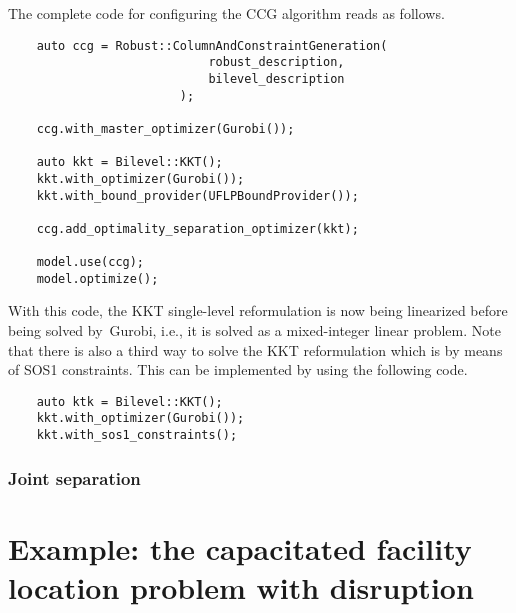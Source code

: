 The complete code for configuring the CCG algorithm reads as follows.
\begin{lstlisting}
    auto ccg = Robust::ColumnAndConstraintGeneration(
                            robust_description,
                            bilevel_description
                        );
    
    ccg.with_master_optimizer(Gurobi());

    auto kkt = Bilevel::KKT();
    kkt.with_optimizer(Gurobi());
    kkt.with_bound_provider(UFLPBoundProvider());

    ccg.add_optimality_separation_optimizer(kkt);

    model.use(ccg);
    model.optimize();
\end{lstlisting}

With this code, the KKT single-level reformulation is now being linearized
before being solved by~\textsf{Gurobi}, i.e., it is solved as a mixed-integer
linear problem. Note that there is also a third way to solve the KKT
reformulation which is by means of SOS1 constraints. This can be implemented
by using the following code.
%
\begin{lstlisting}
    auto ktk = Bilevel::KKT();
    kkt.with_optimizer(Gurobi());
    kkt.with_sos1_constraints();   
\end{lstlisting}





\subsubsection{Joint separation}







\section[Example: the CFLP with disruption]{Example: the capacitated facility location problem with disruption}

